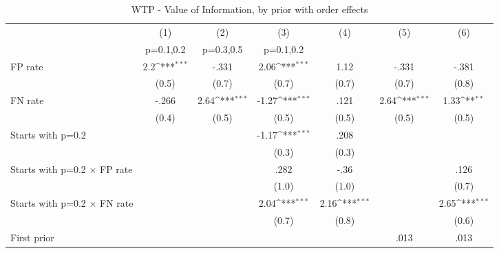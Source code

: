 \begin{table}[htbp]\centering
\def\sym#1{\ifmmode^{#1}\else\(^{#1}\)\fi}
\caption{WTP - Value of Information, by prior with order effects}
\begin{tabular}{l*{6}{c}}
\hline\hline
                &\multicolumn{1}{c}{(1)}&\multicolumn{1}{c}{(2)}&\multicolumn{1}{c}{(3)}&\multicolumn{1}{c}{(4)}&\multicolumn{1}{c}{(5)}&\multicolumn{1}{c}{(6)}\\
                &\multicolumn{1}{c}{p=0.1,0.2}&\multicolumn{1}{c}{p=0.3,0.5}&\multicolumn{1}{c}{p=0.1,0.2}&\multicolumn{1}{c}{}&\multicolumn{1}{c}{}&\multicolumn{1}{c}{}\\
\hline
FP rate         &      2.2\sym{***}&    -.331         &     2.06\sym{***}&     1.12         &    -.331         &    -.381         \\
                &    (0.5)         &    (0.7)         &    (0.7)         &    (0.7)         &    (0.7)         &    (0.8)         \\
FN rate         &    -.266         &     2.64\sym{***}&    -1.27\sym{***}&     .121         &     2.64\sym{***}&     1.33\sym{**} \\
                &    (0.4)         &    (0.5)         &    (0.5)         &    (0.5)         &    (0.5)         &    (0.5)         \\
Starts with p=0.2&                  &                  &    -1.17\sym{***}&     .208         &                  &                  \\
                &                  &                  &    (0.3)         &    (0.3)         &                  &                  \\
Starts with p=0.2 $\times$ FP rate&                  &                  &     .282         &     -.36         &                  &     .126         \\
                &                  &                  &    (1.0)         &    (1.0)         &                  &    (0.7)         \\
Starts with p=0.2 $\times$ FN rate&                  &                  &     2.04\sym{***}&     2.16\sym{***}&                  &     2.65\sym{***}\\
                &                  &                  &    (0.7)         &    (0.8)         &                  &    (0.6)         \\
First prior     &                  &                  &                  &                  &     .013         &     .013         \\

\end{tabular}
\end{table}
